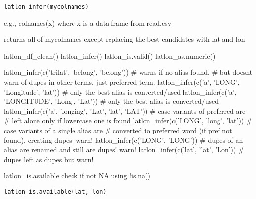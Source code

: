 \documentclass[a4paper]{book}
\begin{document}
%
\begin{Usage}
\begin{verbatim}
latlon_infer(mycolnames)
\end{verbatim}
\end{Usage}
%
\begin{Arguments}
\begin{ldescription}
\item[\code{mycolnames}] e.g., colnames(x) where x is a data.frame from read.csv
\end{ldescription}
\end{Arguments}
%
\begin{Value}
returns all of mycolnames except replacing the best candidates with lat and lon
\end{Value}
%
\begin{SeeAlso}\relax
latlon\_df\_clean() latlon\_infer() latlon\_is.valid() latlon\_as.numeric()
\end{SeeAlso}
%
\begin{Examples}
\begin{ExampleCode}
  latlon_infer(c('trilat', 'belong', 'belong')) # warns if no alias found, 
    #  but doesnt warn of dupes in other terms, just preferred term.
  latlon_infer(c('a', 'LONG', 'Longitude', 'lat')) # only the best alias is converted/used
  latlon_infer(c('a', 'LONGITUDE', 'Long', 'Lat')) # only the best alias is converted/used
  latlon_infer(c('a', 'longing', 'Lat', 'lat', 'LAT')) # case variants of preferred are 
      # left alone only if lowercase one is found
  latlon_infer(c('LONG', 'long', 'lat')) # case variants of a single alias are 
      # converted to preferred word (if pref not found), creating dupes!  warn!
  latlon_infer(c('LONG', 'LONG')) # dupes of an alias are renamed and still are dupes! warn!
  latlon_infer(c('lat', 'lat', 'Lon')) # dupes left as dupes but warn!
  
\end{ExampleCode}
\end{Examples}
%
\begin{Description}\relax
latlon\_is.available
check if not NA using !is.na()
\end{Description}
%
\begin{Usage}
\begin{verbatim}
latlon_is.available(lat, lon)
\end{verbatim}
\end{Usage}
\end{document}
